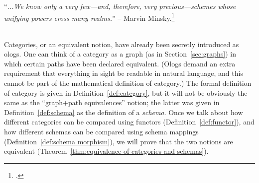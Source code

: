 \documentclass[CT4S-EN-RU]{subfiles}
\begin{document}
\chapter{}\label{chap:categories}

\begin{blockENG}
“{\it ...We know only a very few—and, therefore, very precious—schemes whose unifying powers cross many realms.}” -- Marvin Minsky.\footnote{\cite[Problems of disunity, p. 126]{Min}.}\\\\
\end{blockENG}

\begin{blockRUS}
\end{blockRUS}

\begin{blockENG}
Categories, or an equivalent notion, have already been secretly introduced as ologs. One can think of a category as a graph (as in Section~\ref{sec:graphs}) in which certain paths have been declared equivalent. (Ologs demand an extra requirement that everything in sight be readable in natural language, and this cannot be part of the mathematical definition of category.) The formal definition of category is given in Definition~\ref{def:category}, but it will not be obviously the same as the “graph+path equivalences” notion; the latter was given in Definition~\ref{def:schema} as the definition of a {\em schema}. Once we talk about how different categories can be compared using functors (Definition~\ref{def:functor}), and how different schemas can be compared using schema mappings (Definition~\ref{def:schema morphism}), we will prove that the two notions are equivalent (Theorem~\ref{thm:equivalence of categories and schemas}).
\end{blockENG}
\end{document}
